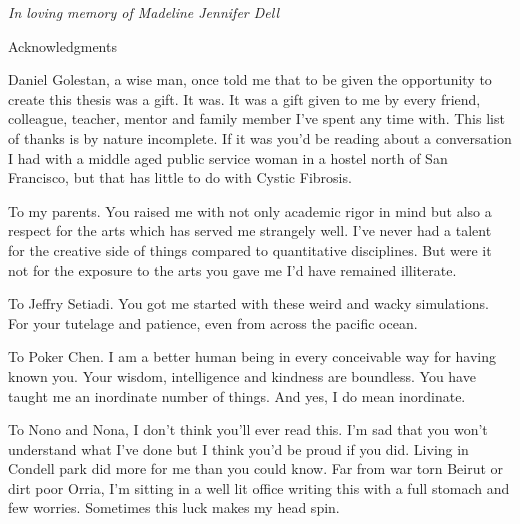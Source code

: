 \newpage


\thispagestyle{empty}


\begin{center}
	\vspace*{\fill}
\textit {In loving memory of Madeline Jennifer Dell} \\
	\vspace*{\fill}
\end{center}

\clearpage

\begin{center}
\begin{Large}
\begin{bfseries}
Acknowledgments
\end{bfseries}
\end{Large}
\end{center}
 Daniel Golestan, a wise man, once told me that to be given the opportunity to create this thesis was a gift. It was. It was a gift given to me by every friend, colleague, teacher, mentor and family member I've spent any time with. This list of thanks is by nature incomplete. If it was you'd be reading about a conversation I had with a middle aged public service woman in a hostel north of San Francisco, but that has little to do with Cystic Fibrosis. 

To my parents. You raised me with not only academic rigor in mind but also a respect for the arts which has served me strangely well. I've never had a talent for the creative side of things compared to quantitative disciplines. But were it not for the exposure to the arts you gave me I'd have remained illiterate. 

To Jeffry Setiadi. You got me started with these weird and wacky simulations. For your tutelage and patience, even from across the pacific ocean.

To Poker Chen. I am a better human being in every conceivable way for having known you. Your wisdom, intelligence and kindness are boundless. You have taught me an inordinate number of things. And yes, I do mean inordinate. 

To Nono and Nona, I don't think you'll ever read this. I'm sad that you won't understand what I've done but I think you'd be proud if you did. Living in Condell park did more for me than you could know. Far from war torn Beirut or dirt poor Orria, I'm sitting in a well lit office writing this with a full stomach and few worries. Sometimes this luck makes my head spin. 

